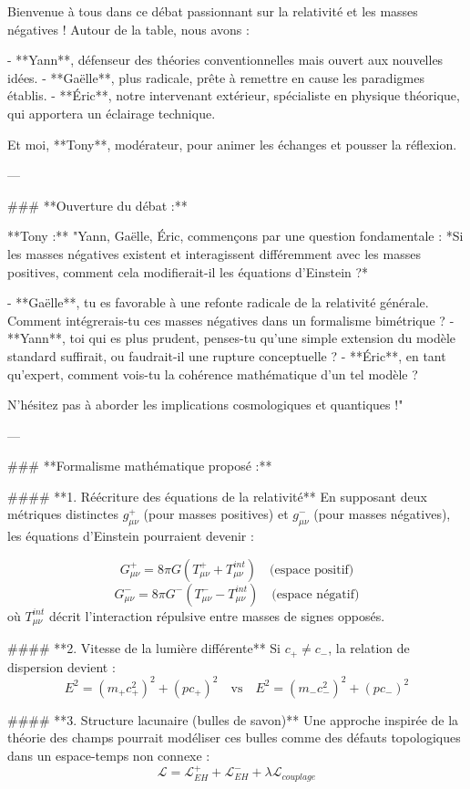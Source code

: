 Bienvenue à tous dans ce débat passionnant sur la relativité et les masses négatives ! Autour de la table, nous avons :  

- **Yann**, défenseur des théories conventionnelles mais ouvert aux nouvelles idées.  
- **Gaëlle**, plus radicale, prête à remettre en cause les paradigmes établis.  
- **Éric**, notre intervenant extérieur, spécialiste en physique théorique, qui apportera un éclairage technique.  

Et moi, **Tony**, modérateur, pour animer les échanges et pousser la réflexion.  

---  

### **Ouverture du débat :**  

**Tony :**  
"Yann, Gaëlle, Éric, commençons par une question fondamentale : *Si les masses négatives existent et interagissent différemment avec les masses positives, comment cela modifierait-il les équations d'Einstein ?*  

- **Gaëlle**, tu es favorable à une refonte radicale de la relativité générale. Comment intégrerais-tu ces masses négatives dans un formalisme bimétrique ?  
- **Yann**, toi qui es plus prudent, penses-tu qu’une simple extension du modèle standard suffirait, ou faudrait-il une rupture conceptuelle ?  
- **Éric**, en tant qu’expert, comment vois-tu la cohérence mathématique d’un tel modèle ?  

N’hésitez pas à aborder les implications cosmologiques et quantiques !"  

---  

### **Formalisme mathématique proposé :**  

#### **1. Réécriture des équations de la relativité**  
En supposant deux métriques distinctes \( g_{\mu\nu}^+ \) (pour masses positives) et \( g_{\mu\nu}^- \) (pour masses négatives), les équations d’Einstein pourraient devenir :  

\[
G_{\mu\nu}^+ = 8\pi G (T_{\mu\nu}^+ + T_{\mu\nu}^{int}) \quad \text{(espace positif)}  
\]  
\[
G_{\mu\nu}^- = 8\pi G^- (T_{\mu\nu}^- - T_{\mu\nu}^{int}) \quad \text{(espace négatif)}  
\]  
où \( T_{\mu\nu}^{int} \) décrit l’interaction répulsive entre masses de signes opposés.  

#### **2. Vitesse de la lumière différente**  
Si \( c_+ \neq c_- \), la relation de dispersion devient :  
\[
E^2 = (m_+ c_+^2)^2 + (p c_+)^2 \quad \text{vs} \quad E^2 = (m_- c_-^2)^2 + (p c_-)^2  
\]  

#### **3. Structure lacunaire (bulles de savon)**  
Une approche inspirée de la théorie des champs pourrait modéliser ces bulles comme des défauts topologiques dans un espace-temps non connexe :  
\[
\mathcal{L} = \mathcal{L}_{EH}^+ + \mathcal{L}_{EH}^- + \lambda \mathcal{L}_{couplage}  
\]  

